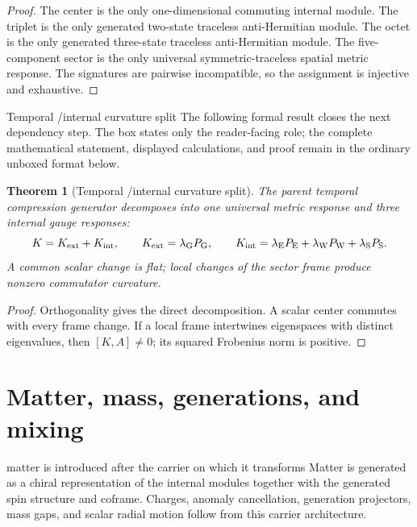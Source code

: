 \documentclass[11pt]{article}
\numberwithin{equation}{section}
\newtheorem{theorem}[definition]{Theorem}
\theoremstyle{remark}
\newcommand{\Pg}{P_{\mathrm G}}
\newcommand{\Pe}{P_{\mathrm E}}
\newcommand{\Pw}{P_{\mathrm W}}
\newcommand{\Ps}{P_{\mathrm S}}
\begin{document}
\begin{proof}
The center is the only one-dimensional commuting internal module. The triplet is the only generated two-state traceless anti-Hermitian module. The octet is the only generated three-state traceless anti-Hermitian module. The five-component sector is the only universal symmetric-traceless spatial metric response. The signatures are pairwise incompatible, so the assignment is injective and exhaustive.
\end{proof}

\begin{proofguide}{Temporal /internal curvature split}
The following formal result closes the next dependency step. The box states only the reader-facing role; the complete mathematical statement, displayed calculations, and proof remain in the ordinary unboxed format below.
\end{proofguide}
\begin{theorem}[Temporal /internal curvature split]
The parent temporal compression generator decomposes into one universal metric response and three internal gauge responses:
\begin{equation}
K=K_{\rm ext}+K_{\rm int},\qquad
K_{\rm ext}=\lambda_{\rm G}\Pg,
\qquad
K_{\rm int}=\lambda_{\rm E}\Pe+\lambda_{\rm W}\Pw+\lambda_{\rm S}\Ps.
\end{equation}
A common scalar change is flat; local changes of the sector frame produce nonzero commutator curvature.
\end{theorem}

\begin{proof}
Orthogonality gives the direct decomposition. A scalar center commutes with every frame change. If a local frame intertwines eigenspaces with distinct eigenvalues, then $[K,A]\neq0$; its squared Frobenius norm is positive.
\end{proof}

\section{Matter, mass, generations, and mixing}
\begin{conceptledger}{matter is introduced after the carrier on which it transforms}
Matter is generated as a chiral representation of the internal modules together with the generated spin structure and coframe. Charges, anomaly cancellation, generation projectors, mass gaps, and scalar radial motion follow from this carrier architecture.
\end{conceptledger}
\end{document}
